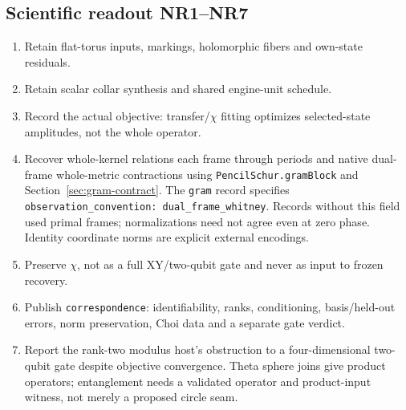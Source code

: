 \documentclass[11pt]{article}
\theoremstyle{definition}
\theoremstyle{remark}
\begin{document}
\subsection{Scientific readout NR1--NR7}
\begin{enumerate}[label=NR\arabic*.,leftmargin=*]
\item Retain flat-torus inputs, markings, holomorphic fibers and own-state residuals.
\item Retain scalar collar synthesis and shared engine-unit schedule.
\item Record the actual objective: transfer/$\chi$ fitting
optimizes selected-state amplitudes, not the whole operator.
\item Recover whole-kernel relations each frame through periods and native
dual-frame whole-metric contractions using \texttt{PencilSchur.gramBlock}
and Section~\ref{sec:gram-contract}. The \texttt{gram} record specifies
\texttt{observation\_convention: dual\_frame\_whitney}. Records without
this field used primal frames; normalizations need not agree even
at zero phase. Identity coordinate norms are explicit external encodings.
\item Preserve $\chi$, not as a full XY/two-qubit gate and
never as input to frozen recovery.
\item Publish \texttt{correspondence}: identifiability, ranks, conditioning,
basis/held-out errors, norm preservation, Choi data and a separate gate verdict.
\item Report the rank-two modulus host's obstruction to a four-dimensional
two-qubit gate despite objective convergence. Theta sphere joins give
product operators; entanglement needs a validated operator and product-input
witness, not merely a proposed circle seam.
\end{enumerate}
\end{document}
